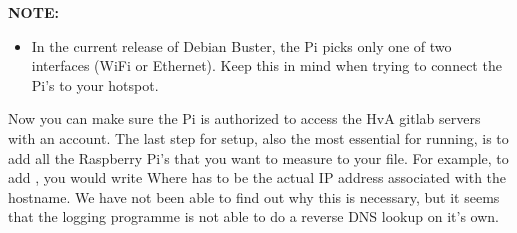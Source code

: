 \textbf{NOTE:}
\begin{itemize}
	\item In the current release of Debian Buster, the Pi picks only one of two interfaces (WiFi or Ethernet). Keep this in mind when trying to connect the Pi's to your hotspot.
\end{itemize}
Now you can make sure the Pi is authorized to access the HvA gitlab servers with an account.
\newline
The last step for setup, also the most essential for running, is to add all the Raspberry Pi's that you want to measure to your  file. For example, to add , you would write\newline
{}\newline
Where  has to be the actual IP address associated with the hostname. We have not been able to find out why this is necessary, but it seems that the logging programme is not able to do a reverse DNS lookup on it's own.